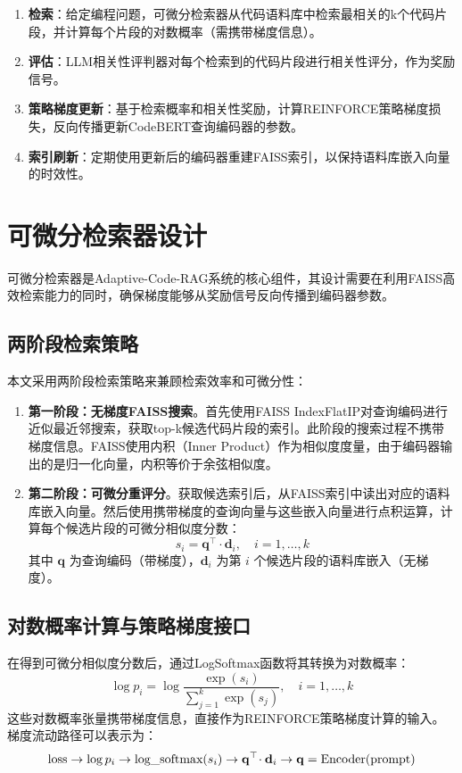 \documentclass[
    fontset = win, %
  ]{njuthesis}
\begin{document}
\begin{enumerate}
    \item \textbf{检索}：给定编程问题，可微分检索器从代码语料库中检索最相关的k个代码片段，并计算每个片段的对数概率（需携带梯度信息）。
    \item \textbf{评估}：LLM相关性评判器对每个检索到的代码片段进行相关性评分，作为奖励信号。
    \item \textbf{策略梯度更新}：基于检索概率和相关性奖励，计算REINFORCE策略梯度损失，反向传播更新CodeBERT查询编码器的参数。
    \item \textbf{索引刷新}：定期使用更新后的编码器重建FAISS索引，以保持语料库嵌入向量的时效性。
\end{enumerate}


\section{可微分检索器设计}

可微分检索器是Adaptive-Code-RAG系统的核心组件，其设计需要在利用FAISS高效检索能力的同时，确保梯度能够从奖励信号反向传播到编码器参数。

\subsection{两阶段检索策略}

本文采用两阶段检索策略来兼顾检索效率和可微分性：

\begin{enumerate}
    \item \textbf{第一阶段：无梯度FAISS搜索}。首先使用FAISS IndexFlatIP对查询编码进行近似最近邻搜索，获取top-k候选代码片段的索引。此阶段的搜索过程不携带梯度信息。FAISS使用内积（Inner Product）作为相似度度量，由于编码器输出的是归一化向量，内积等价于余弦相似度。
    \item \textbf{第二阶段：可微分重评分}。获取候选索引后，从FAISS索引中读出对应的语料库嵌入向量。然后使用携带梯度的查询向量与这些嵌入向量进行点积运算，计算每个候选片段的可微分相似度分数：
    \[
    s_i = \mathbf{q}^\top \cdot \mathbf{d}_i, \quad i = 1, \ldots, k
    \]
    其中 $\mathbf{q}$ 为查询编码（带梯度），$\mathbf{d}_i$ 为第 $i$ 个候选片段的语料库嵌入（无梯度）。
\end{enumerate}

\subsection{对数概率计算与策略梯度接口}

在得到可微分相似度分数后，通过LogSoftmax函数将其转换为对数概率：
\[
\log p_i = \log \frac{\exp(s_i)}{\sum_{j=1}^k \exp(s_j)}, \quad i = 1, \ldots, k
\]
这些对数概率张量携带梯度信息，直接作为REINFORCE策略梯度计算的输入。梯度流动路径可以表示为：
\[
\text{loss} \to \log p_i \to \text{log\textunderscore softmax}(s_i) \to \mathbf{q}^\top \! \cdot \mathbf{d}_i \to \mathbf{q} = \text{Encoder}(\text{prompt})
\]
\end{document}
